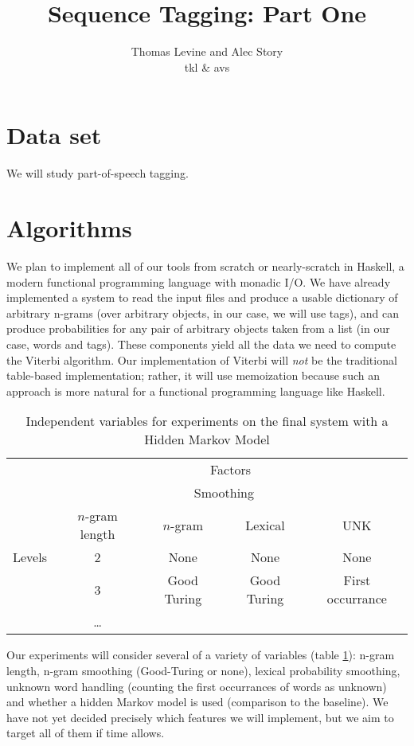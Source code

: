 \documentclass{article}
\title{Sequence Tagging: Part One}
\author{Thomas Levine and Alec Story\\\small{tkl\osn{22} \& avs\osn{38}}}
\begin{document}
\maketitle
\section{Data set}
We will study part-of-speech tagging.
\section{Algorithms}

We plan to implement all of our tools from scratch or nearly-scratch in Haskell,
a modern functional programming language with monadic I/O.  We have already
implemented a system to read the input files and produce a usable dictionary of
arbitrary n-grams (over arbitrary objects, in our case, we will use tags), and
can produce probabilities for any pair of arbitrary objects taken from a list
(in our case, words and tags).  These components yield all the data we need to
compute the Viterbi algorithm.  Our implementation of Viterbi will \emph{not} be
the traditional table-based implementation; rather, it will use memoization
because such an approach is more natural for a functional programming language
like Haskell.

\begin{table}
\begin{tabular}{lcccc}
& \multicolumn{4}{c}{Factors} \\
\cmidrule{2-5}
& & \multicolumn{2}{c}{Smoothing} \\
\cmidrule{3-4}
       & $n$-gram length & $n$-gram & Lexical & UNK\\
\cmidrule{2-5}
Levels &  2  & None        & None        & None \\
       &  3  & Good Turing & Good Turing & First occurrance  \\
       &  \ldots  &             &             &      \\
\cmidrule{2-5}
\end{tabular}
\caption{\label{tab:ind_vars}Independent variables for experiments on the final system with a Hidden Markov Model}
\end{table}

Our experiments will consider several of a variety of variables (table \ref{tab:ind_vars}): n-gram length,
n-gram smoothing (Good-Turing or none), lexical probability smoothing, unknown
word handling (counting the first occurrances of words as unknown) and
whether a hidden Markov model is used (comparison to the baseline).
We have not yet decided precisely which features we will implement, but we
aim to target all of them if time allows.
\end{document}
